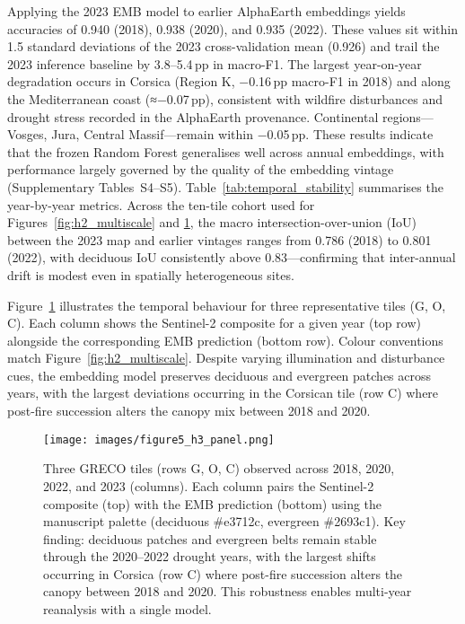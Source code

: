 \documentclass[utf8]{FrontiersinHarvard}
\begin{document}
Applying the 2023 EMB model to earlier AlphaEarth embeddings yields accuracies of 0.940 (2018), 0.938 (2020), and 0.935 (2022). These values sit within 1.5 standard deviations of the 2023 cross-validation mean (0.926) and trail the 2023 inference baseline by 3.8–5.4\,pp in macro-F1. The largest year-on-year degradation occurs in Corsica (Region K, −0.16\,pp macro-F1 in 2018) and along the Mediterranean coast (≈−0.07\,pp), consistent with wildfire disturbances and drought stress recorded in the AlphaEarth provenance. Continental regions—Vosges, Jura, Central Massif—remain within −0.05\,pp. These results indicate that the frozen Random Forest generalises well across annual embeddings, with performance largely governed by the quality of the embedding vintage (Supplementary Tables~S4–S5). Table~\ref{tab:temporal_stability} summarises the year-by-year metrics. Across the ten-tile cohort used for Figures~\ref{fig:h2_multiscale} and \ref{fig:h3_temporal}, the macro intersection-over-union (IoU) between the 2023 map and earlier vintages ranges from 0.786 (2018) to 0.801 (2022), with deciduous IoU consistently above 0.83—confirming that inter-annual drift is modest even in spatially heterogeneous sites.

Figure~\ref{fig:h3_temporal} illustrates the temporal behaviour for three representative tiles (G, O, C). Each column shows the Sentinel-2 composite for a given year (top row) alongside the corresponding EMB prediction (bottom row). Colour conventions match Figure~\ref{fig:h2_multiscale}. Despite varying illumination and disturbance cues, the embedding model preserves deciduous and evergreen patches across years, with the largest deviations occurring in the Corsican tile (row C) where post-fire succession alters the canopy mix between 2018 and 2020.

\begin{figure}[H]
    \centering
    \texttt{[image: images/figure5\_h3\_panel.png]}
    \caption{Three GRECO tiles (rows G, O, C) observed across 2018, 2020, 2022, and 2023 (columns). Each column pairs the Sentinel-2 composite (top) with the EMB prediction (bottom) using the manuscript palette (deciduous \#e3712c, evergreen \#2693c1). Key finding: deciduous patches and evergreen belts remain stable through the 2020--2022 drought years, with the largest shifts occurring in Corsica (row C) where post-fire succession alters the canopy between 2018 and 2020. This robustness enables multi-year reanalysis with a single model.}
    \label{fig:h3_temporal}
\end{figure}
\end{document}
